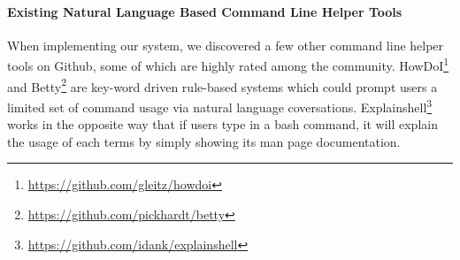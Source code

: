 
\paragraph{Existing Natural Language Based Command Line Helper Tools} When implementing our system, we discovered a few other command line helper tools on Github, some of which are highly rated among the community. HowDoI\footnote{\url{https://github.com/gleitz/howdoi}} and Betty\footnote{\url{https://github.com/pickhardt/betty}} are key-word driven rule-based systems which could prompt users a limited set of command usage via natural language coversations. Explainshell\footnote{\url{https://github.com/idank/explainshell}} works in the opposite way that if users type in a bash command, it will explain the usage of each terms by simply showing its man page documentation.


